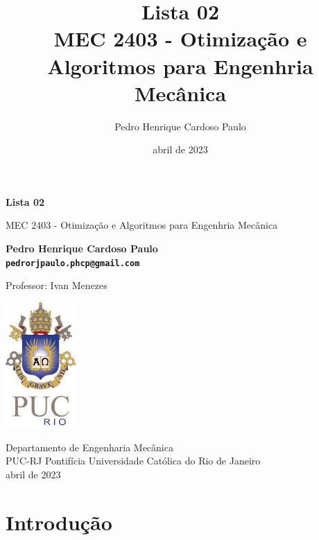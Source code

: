 \documentclass[10pt, a4paper]{article}
\begin{document}
\def\TITLE{Lista 02}
\def\DISCIPLINE{MEC 2403 - Otimização e Algoritmos para Engenhria Mecânica}
\def\PROFESSOR{Ivan Menezes}
\def\AUTHOR{Pedro Henrique Cardoso Paulo}
\def\CONTACT{pedrorjpaulo.phcp@gmail.com}
\def\DATE{abril de 2023}

\title{\textbf{\TITLE} \\ \DISCIPLINE}
\author{\AUTHOR}
\date{\DATE}

\begin{titlepage}
      \begin{center}
          \vspace*{1cm}

          \Huge
          \textbf{\TITLE}

          \vspace{0.5cm}
          \LARGE
          \DISCIPLINE

          \vspace{1.5cm}

          \textbf{\AUTHOR \\ {\tt \CONTACT}}

          \vfill
          Professor: \PROFESSOR

          \vspace{0.8cm}

          \includegraphics[width=0.2\textwidth]{../general/puc.jpg}

          \Large
          Departamento de Engenharia Mecânica\\
          PUC-RJ Pontifícia Universidade Católica do Rio de Janeiro\\
          \DATE

      \end{center}
  \end{titlepage}

\maketitle

\section{Introdução}
\end{document}
